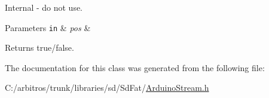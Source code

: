Internal -\/ do not use. 
\begin{DoxyParams}[1]{Parameters}
\mbox{\tt in}  & {\em pos} & \\
\hline
\end{DoxyParams}
\begin{DoxyReturn}{Returns}
true/false. 
\end{DoxyReturn}


The documentation for this class was generated from the following file\-:\begin{DoxyCompactItemize}
\item 
C\-:/arbitros/trunk/libraries/sd/\-Sd\-Fat/\hyperlink{_arduino_stream_8h}{Arduino\-Stream.\-h}\end{DoxyCompactItemize}
